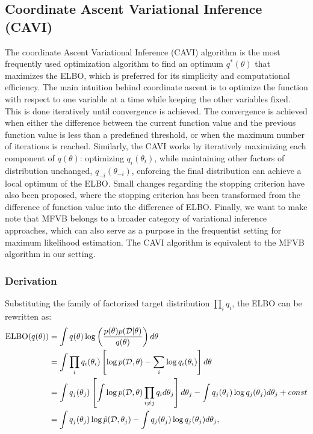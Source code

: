 \subsection{Coordinate Ascent Variational Inference (CAVI)}
The coordinate Ascent Variational Inference (CAVI) algorithm is the most frequently used optimization algorithm to find an optimum $q^*(\theta)$ that maximizes the ELBO, which is preferred for its simplicity and computational efficiency. The main intuition behind coordinate ascent is to optimize the function with respect to one variable at a time while keeping the other variables fixed. This is done iteratively until convergence is achieved. The convergence is achieved when either the difference between the current function value and the previous function value is less than a predefined threshold, or when the maximum number of iterations is reached.
Similarly, the CAVI works by iteratively maximizing each component of $q(\theta)$: optimizing $q_i(\theta_i)$, while maintaining other factors of distribution unchanged, $q_{-i}(\theta_{-i})$, enforcing the final distribution can achieve a local optimum of the ELBO. 
Small changes regarding the stopping criterion have also been proposed, where the stopping criterion has been transformed from the difference of function value into the difference of ELBO.
Finally, we want to make note that MFVB belongs to a broader category of variational inference approaches, which can also serve as a purpose in the frequentist setting for maximum likelihood estimation. The CAVI algorithm is equivalent to the MFVB algorithm in our setting.

\subsubsection{Derivation}
Substituting the family of factorized target distribution $\prod_i q_i$, the ELBO can be rewritten as:
\begin{equation}
	\label{eq:ELBOderive}	
	\begin{aligned}
		\textnormal{ELBO}(q(\theta)) &= \int q(\theta)\log\left(\frac{p(\theta)p(\mathcal{D}|\theta)}{q(\theta)} \right)d\theta \\
		&= \int \prod_i q_i(\theta_i) \left[\log p(\mathcal{D},\theta) - \sum_i \log q_i(\theta_i) \right]d\theta \\
		&= \int q_j(\theta_j)\left[\int \log p(\mathcal{D},\theta) \prod_{i\neq j}q_i d\theta_j \right]d\theta_j - \int q_j(\theta_j) \log q_j(\theta_j) d\theta_j + const\\
		&= \int q_j(\theta_j) \log \tilde{p}(\mathcal{D},\theta_j) - \int q_j(\theta_j) \log q_j(\theta_j) d\theta_j,
	\end{aligned}
\end{equation}

